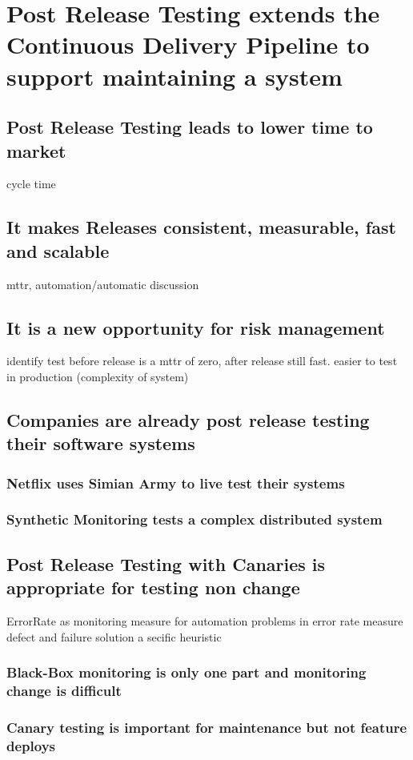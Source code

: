 \chapter{Post Release Testing extends the Continuous Delivery Pipeline to support maintaining a system}
\section{Post Release Testing leads to lower time to market}
cycle time
\section{It makes Releases consistent, measurable, fast and scalable}
mttr, automation/automatic discussion
\section{It is a new opportunity for risk management}
identify test before release is a mttr of zero, after release still fast. easier to test in production (complexity of system)
\section{Companies are already post release testing their software systems}
\subsection{Netflix uses Simian Army to live test their systems}
\subsection{Synthetic Monitoring tests a complex distributed system}
\section{Post Release Testing with Canaries is appropriate for testing non change}
ErrorRate as monitoring measure for automation
problems in error rate measure defect and failure
solution a secific heuristic
\subsection{Black-Box monitoring is only one part and monitoring change is difficult}
\subsection{Canary testing is important for maintenance but not feature deploys}
